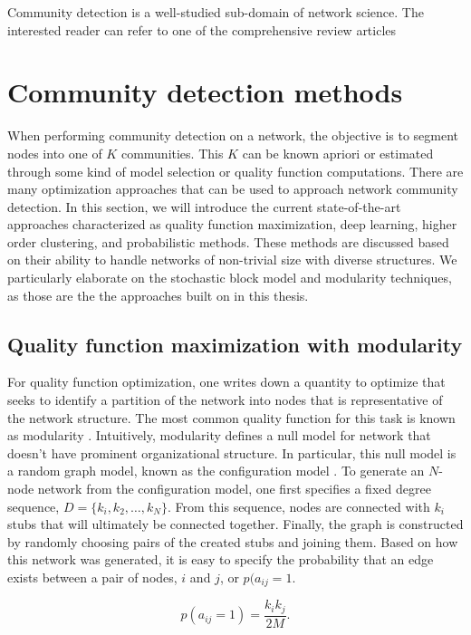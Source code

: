 Community detection is a well-studied sub-domain of network science. The interested reader can refer to one of the comprehensive review articles \cite{fortu1,fortu2,shaicase}

\section{Community detection methods}
When performing community detection on a network, the objective is to segment nodes into one of $K$ communities. This $K$ can be known apriori or estimated through some kind of model selection or quality function computations. There are many optimization approaches that can be used to approach network community detection. In this section, we will introduce the current state-of-the-art approaches characterized as quality function maximization, deep learning, higher order clustering, and probabilistic methods. These methods are discussed based on their ability to handle networks of non-trivial size with diverse structures. We particularly elaborate on the stochastic block model and modularity techniques, as those are the the approaches built on in this thesis.  

\subsection{Quality function maximization with modularity}
\indent For quality function optimization, one writes down a quantity to optimize that seeks to identify a partition of the network into nodes that is representative of the network structure. The most common quality function for this task is known as modularity \cite{newman2006modularity}. Intuitively, modularity defines a null model for network that doesn't have prominent organizational structure. In particular, this null model is a random graph model, known as the configuration model \cite{benderCanfield}. To generate an $N$-node network from the configuration model, one first specifies a fixed degree sequence, $D=\{k_{i},k_{2},\dots,k_{N}\}$. From this sequence, nodes are connected with $k_{i}$ stubs that will ultimately be connected together. Finally, the graph is constructed by randomly choosing pairs of the created stubs and joining them. Based on how this network was generated, it is easy to specify the probability that an edge exists between a pair of nodes, $i$ and $j$, or $p(a_{ij}=1$.

\begin{equation}
p(a_{ij}=1)=\frac{k_{i}k_{j}}{2M}.
\end{equation}

